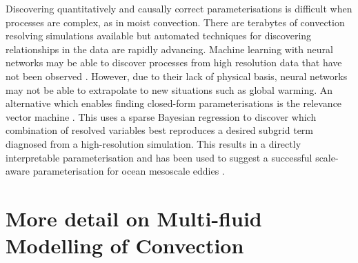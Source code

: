 \documentclass[11pt,a4paper]{article}
\begin{document}
Discovering quantitatively and causally correct parameterisations is difficult when processes are complex, as in moist convection. There are terabytes of convection resolving simulations available but automated techniques for discovering relationships in the data are rapidly advancing. Machine learning with neural networks may be able to discover processes from high resolution data that have not been observed \cite[e.g.][]{ogorman2018}. However, due to their lack of physical basis, neural networks may not be able to extrapolate to new situations such as global warming. An alternative which enables finding closed-form parameterisations is the relevance vector machine \cite[e.g.][]{tipping2001}. This uses a sparse Bayesian regression to discover which combination of resolved variables best reproduces a desired subgrid term diagnosed from a high-resolution simulation. This results in a directly interpretable parameterisation and has been used to suggest a successful scale-aware parameterisation for ocean mesoscale eddies \cite[]{zanna2020}.

\section{More detail on Multi-fluid Modelling of Convection}
\label{sec:mf}
\end{document}
